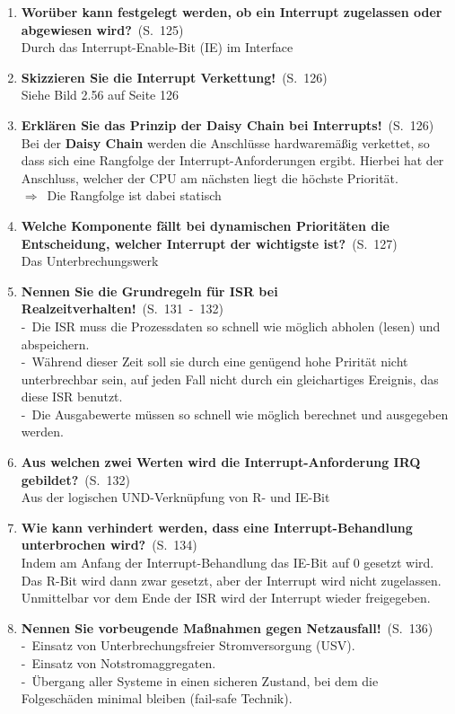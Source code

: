 \documentclass[a4paper,12pt]{article}
\newcommand{\question}[3]{\pagebreak[3]\item {\textbf{#1?}}\ (S.\ #2)#3}
\newcommand{\statement}[3]{\pagebreak[3]\item {\textbf{#1!}}\ (S.\ #2)#3}
\newcommand{\catchword}[1]{\\-\ #1}
\newcommand{\normaltext}[1]{\\#1}
\newcommand{\result}[1]{\\ $\Rightarrow$\ #1}
\newcommand{\page}[1]{#1}
\newcommand{\pages}[2]{#1\ -\ #2}
\newcommand{\important}[1]{\textbf{#1}}
\begin{document}
\begin{enumerate}
  \question{Worüber kann festgelegt werden, ob ein Interrupt zugelassen
            oder abgewiesen wird}{\page{125}}
  {
    \normaltext{Durch das Interrupt-Enable-Bit (IE) im Interface}
  }

  \statement{Skizzieren Sie die Interrupt Verkettung}{\page{126}}
  {
    \normaltext{Siehe Bild 2.56 auf Seite 126}
  }

  \statement{Erklären Sie das Prinzip der Daisy Chain bei Interrupts}{\page{126}}
  {
    \normaltext{Bei der \important{Daisy Chain} werden die Anschlüsse hardwaremäßig
                verkettet, so dass sich eine Rangfolge der Interrupt-Anforderungen
                ergibt. Hierbei hat der Anschluss, welcher der CPU am nächsten liegt
                die höchste Priorität.}
    \result{Die Rangfolge ist dabei statisch}
  }

  \question{Welche Komponente fällt bei dynamischen Prioritäten die Entscheidung,
            welcher Interrupt der wichtigste ist}{\page{127}}
  {
    \normaltext{Das Unterbrechungswerk}
  }


  \statement{Nennen Sie die Grundregeln für ISR bei Realzeitverhalten}{\pages{131}{132}}
  {
    \catchword{Die ISR muss die Prozessdaten so schnell wie möglich abholen (lesen) und abspeichern.}
    \catchword{Während dieser Zeit soll sie durch eine genügend hohe Prirität nicht unterbrechbar sein, 
    auf jeden Fall nicht durch ein gleichartiges Ereignis, das diese ISR benutzt.}
    \catchword{Die Ausgabewerte müssen so schnell wie möglich berechnet und ausgegeben werden.}
  }


  \question{Aus welchen zwei Werten wird die Interrupt-Anforderung IRQ gebildet}{\page{132}}
  {
    \normaltext{Aus der logischen UND-Verknüpfung von R- und IE-Bit}
  }

  \question{Wie kann verhindert werden, dass eine Interrupt-Behandlung unterbrochen wird}{\page{134}}
  {
    \normaltext{Indem am Anfang der Interrupt-Behandlung das IE-Bit auf 0 gesetzt wird.
                Das R-Bit wird dann zwar gesetzt, aber der Interrupt wird nicht zugelassen.
                Unmittelbar vor dem Ende der ISR wird der Interrupt wieder freigegeben.}
  }

  \statement{Nennen Sie vorbeugende Maßnahmen gegen Netzausfall}{\page{136}}
  {
    \catchword{Einsatz von Unterbrechungsfreier Stromversorgung (USV).}
    \catchword{Einsatz von Notstromaggregaten.}
    \catchword{Übergang aller Systeme in einen sicheren Zustand, bei dem die Folgeschäden minimal
    bleiben (fail-safe Technik).}
  }
  

\end{enumerate}
\end{document}
